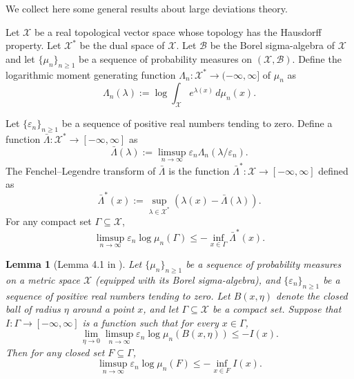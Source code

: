 \documentclass[12pt,twoside,a4paper]{article}
\newtheorem{lemma}[theorem]{Lemma}
\begin{document}
We collect here some general results about large deviations theory.
\begin{theorem}\label{ThmGeneralLargeDevChatterjee4.1}
Let $\mathscr{X}$ be a real topological vector space whose topology has the Hausdorff property. Let $\mathscr{X}^*$ be the dual space of $\mathscr{X}$. Let $\mathscr{B}$ be the Borel sigma-algebra of $\mathscr{X}$ and let $\{\mu_n\}_{n \geq 1}$ be a sequence of probability measures on $(\mathscr{X}, \mathscr{B})$. Define the logarithmic moment generating function $\Lambda_n : \mathscr{X}^* \to (-\infty, \infty]$ of $\mu_n$ as
\[
\Lambda_n(\lambda) := \log \int_{\mathscr{X}} e^{\lambda(x)} \, d\mu_n(x).
\]

Let $\{\varepsilon_n\}_{n \geq 1}$ be a sequence of positive real numbers tending to zero. Define a function $\bar{\Lambda} : \mathscr{X}^* \to [-\infty, \infty]$ as
\begin{equation*}
\bar{\Lambda}(\lambda) := \limsup_{n \to \infty} \varepsilon_n \Lambda_n(\lambda/\varepsilon_n).
\end{equation*}
The Fenchel--Legendre transform of $\bar{\Lambda}$ is the function $\bar{\Lambda}^* : \mathscr{X} \to [-\infty, \infty]$ defined as
\begin{equation}
\bar{\Lambda}^*(x) := \sup_{\lambda \in \mathscr{X}^*} \left( \lambda(x) - \bar{\Lambda}(\lambda) \right).
\end{equation}
For any compact set $\Gamma \subseteq \mathscr{X}$,
\[
\limsup_{n \to \infty} \varepsilon_n \log \mu_n(\Gamma) \leq -\inf_{x \in \Gamma} \bar{\Lambda}^*(x).
\]
\end{theorem}


\begin{lemma}[Lemma 4.1 in \cite{chatterjee2017large}]\label{lemma:upperbound_balls}
Let $\{\mu_n\}_{n \geq 1}$ be a sequence of probability measures on a metric space $\mathscr{X}$ (equipped with its Borel sigma-algebra), and $\{\varepsilon_n\}_{n \geq 1}$ be a sequence of positive real numbers tending to zero. Let $B(x, \eta)$ denote the closed ball of radius $\eta$ around a point $x$, and let $\Gamma \subseteq \mathscr{X}$ be a compact set. Suppose that $I : \Gamma \to [-\infty, \infty]$ is a function such that for every $x \in \Gamma$,
\[
\lim_{\eta \to 0} \limsup_{n \to \infty} \varepsilon_n \log \mu_n(B(x, \eta)) \leq -I(x).
\]
Then for any closed set $F \subseteq \Gamma$,
\[
\limsup_{n \to \infty} \varepsilon_n \log \mu_n(F) \leq -\inf_{x \in F} I(x).
\]
\end{lemma}
\end{document}
